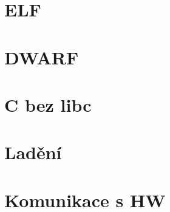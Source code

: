 





\section{ELF}
\frame{\sectionpage}



\section{DWARF}
\frame{\sectionpage}




\section{C bez libc}
\frame{\sectionpage}


\section{Ladění}
\frame{\sectionpage}




\section{Komunikace s HW}
\frame{\sectionpage}



